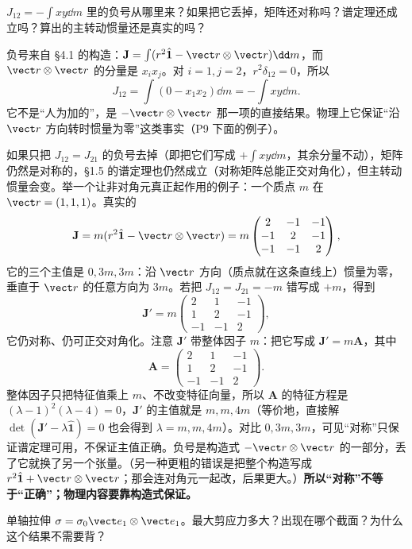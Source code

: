 \documentclass[11pt]{ctexart}
\newcommand{\ten}[1]{\mathbf{#1}}
\newcommand{\unitd}{\hat{\ten{1}}}
\begin{document}
{$J_{12}=-\int xy\dd m$ 里的负号从哪里来？如果把它丢掉，矩阵还对称吗？谱定理还成立吗？算出的主转动惯量还是真实的吗？}

负号来自 §4.1 的构造：$\ten J=\int(r^2\unitd-\vect r\otimes\vect r)\dd m$，而 $\vect r\otimes\vect r$ 的分量是 $x_ix_j$。对 $i=1,j=2$，$r^2\delta_{12}=0$，所以
\[
J_{12}=\int(0-x_1x_2)\dd m=-\int xy\dd m .
\]
它不是“人为加的”，是 $-\vect r\otimes\vect r$ 那一项的直接结果。物理上它保证“沿 $\vect r$ 方向转时惯量为零”这类事实（P9 下面的例子）。

如果只把 $J_{12}=J_{21}$ 的负号去掉（即把它们写成 $+\int xy\dd m$，其余分量不动），矩阵仍然是对称的，§1.5 的谱定理也仍然成立（对称矩阵总能正交对角化），但主转动惯量会变。举一个让非对角元真正起作用的例子：一个质点 $m$ 在 $\vect r=(1,1,1)$。真实的
\[
\ten J=m(r^2\unitd-\vect r\otimes\vect r)
=m\begin{pmatrix}2&-1&-1\\-1&2&-1\\-1&-1&2\end{pmatrix},
\]
它的三个主值是 $0,3m,3m$：沿 $\vect r$ 方向（质点就在这条直线上）惯量为零，垂直于 $\vect r$ 的任意方向为 $3m$。若把 $J_{12}=J_{21}=-m$ 错写成 $+m$，得到
\[
\ten J'=m\begin{pmatrix}2&1&-1\\1&2&-1\\-1&-1&2\end{pmatrix},
\]
它仍对称、仍可正交对角化。注意 $\ten J'$ 带整体因子 $m$：把它写成 $\ten J'=m\ten A$，其中
\[
\ten A=\begin{pmatrix}2&1&-1\\1&2&-1\\-1&-1&2\end{pmatrix}.
\]
整体因子只把特征值乘上 $m$、不改变特征向量，所以 $\ten A$ 的特征方程是 $(\lambda-1)^2(\lambda-4)=0$，$\ten J'$ 的主值就是 $m,m,4m$（等价地，直接解 $\det(\ten J'-\lambda\unitd)=0$ 也会得到 $\lambda=m,m,4m$）。对比 $0,3m,3m$，可见“对称”只保证谱定理可用，不保证主值正确。负号是构造式 $-\vect r\otimes\vect r$ 的一部分，丢了它就换了另一个张量。（另一种更粗的错误是把整个构造写成 $r^2\unitd+\vect r\otimes\vect r$；那会连对角元一起改，后果更大。）\textbf{所以“对称”不等于“正确”；物理内容要靠构造式保证。}

{单轴拉伸 $\ten\sigma=\sigma_0\vect e_1\otimes\vect e_1$。最大剪应力多大？出现在哪个截面？为什么这个结果不需要背？}
\end{document}
